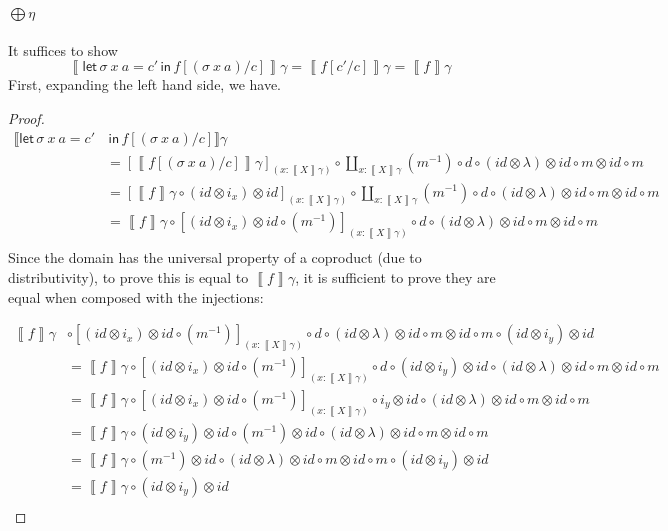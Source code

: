 \documentclass[acmsmall,nonacm]{acmart}
\newcommand{\sem}[1]{\left\llbracket{#1}\right\rrbracket}
\newcommand{\semg}[1]{\sem{#1}\gamma}
\newcommand{\letin}[3]{\mathsf{let}\, #1 = #2 \, \mathsf{in}\, #3}
\begin{document}
{\paragraph{$\bigoplus\eta$}
It suffices to show
\[
  \semg{\letin {\sigma~x~a} {c'} {f[(\sigma~x~a)/c]}} = \semg{f[c'/c]} = \semg{f}
  \]
First, expanding the left hand side, we have.
\begin{proof}
  \begin{align*}
    \llbracket \mathsf{let}\, {\sigma~x~a} = {c'} & \, \mathsf{in}\, {f[(\sigma~x~a)/c]} \rrbracket \gamma \\
    &= [ \semg{f[(\sigma~x~a)/c]} ]_{(x : \semg{X})} \circ \coprod_{x:\semg{X}}(m^{-1}) \circ d \circ (id \otimes \lambda) \otimes id \circ m \otimes id \circ m\\
    &= [ \semg{f} \circ (id \otimes i_x) \otimes id ]_{(x : \semg{X})} \circ \coprod_{x:\semg{X}}(m^{-1}) \circ d \circ (id \otimes \lambda) \otimes id \circ m \otimes id \circ m\\
    &= \semg{f} \circ [ (id \otimes i_x) \otimes id \circ (m^{-1})]_{(x : \semg{X})} \circ d \circ (id \otimes \lambda) \otimes id \circ m \otimes id \circ m\\
  \end{align*}
Since the domain has the universal property of a coproduct (due to distributivity), to prove
this is equal to $\semg{f}$, it is sufficient to prove they are equal
when composed with the injections:

\begin{align*}
  \semg{f} &\circ [ (id \otimes i_x) \otimes id \circ (m^{-1})]_{(x : \semg{X})} \circ d \circ (id \otimes \lambda) \otimes id \circ m \otimes id \circ m \circ (id \otimes i_y) \otimes id\\
  &= \semg{f} \circ [ (id \otimes i_x) \otimes id \circ (m^{-1})]_{(x : \semg{X})} \circ d  \circ (id \otimes i_y) \otimes id \circ (id \otimes \lambda) \otimes id \circ m \otimes id \circ m \tag{naturality}\\
  &= \semg{f} \circ [ (id \otimes i_x) \otimes id \circ (m^{-1})]_{(x : \semg{X})} \circ i_y \otimes id \circ (id \otimes \lambda) \otimes id \circ m \otimes id \circ m \tag{naturality}\\
  &= \semg{f} \circ (id \otimes i_y) \otimes id \circ (m^{-1}) \otimes id \circ (id \otimes \lambda) \otimes id \circ m \otimes id \circ m \\
  &= \semg{f} \circ (m^{-1}) \otimes id \circ (id \otimes \lambda) \otimes id \circ m \otimes id \circ m \circ (id \otimes i_y) \otimes id \\
  &= \semg{f} \circ (id \otimes i_y) \otimes id \tag{coherence}\\
\end{align*}
\end{proof}

}
\end{document}
